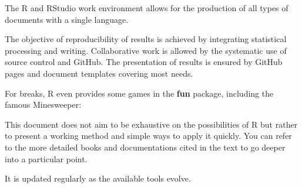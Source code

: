 \documentclass[
  12pt,
  american,
  a4paper,
  extrafontsizes,onecolumn,openright
  ]{memoir}
\makeatletter
\newenvironment{Shaded}{\begin{snugshade}}{\end{snugshade}}
\newcommand{\AttributeTok}[1]{\textcolor[rgb]{0.13,0.29,0.53}{#1}}
\newcommand{\CommentTok}[1]{\textcolor[rgb]{0.56,0.35,0.01}{\textit{#1}}}
\newcommand{\ControlFlowTok}[1]{\textcolor[rgb]{0.13,0.29,0.53}{\textbf{#1}}}
\newcommand{\FunctionTok}[1]{\textcolor[rgb]{0.13,0.29,0.53}{\textbf{#1}}}
\newcommand{\NormalTok}[1]{#1}
\newcommand{\SpecialCharTok}[1]{\textcolor[rgb]{0.81,0.36,0.00}{\textbf{#1}}}
\newcommand{\StringTok}[1]{\textcolor[rgb]{0.31,0.60,0.02}{#1}}
\newcommand{\MemoirChapStyle}{daleif1}
\newcommand{\MemoirPageStyle}{Ruled}
\newlength\widthw %
\newcommand*{\SmallMargins}{
  \setlrmarginsandblock{1.5in}{1.5in}{*}
  \setmarginnotes{0.1in}{0.1in}{0.1in}
 \setulmarginsandblock{1.5in}{1in}{*}
  \checkandfixthelayout
  \ch@ngetext
  \clearpage
  \setlength{\widthw}{\textwidth+\marginparsep+\marginparwidth}
  \footnotesatfoot
  \chapterstyle{\MemoirChapStyle}  %
  \pagestyle{\MemoirPageStyle}
}
\newcommand{\LargeMargins}{\SmallMargins}
\makeatother
\begin{document}
The R and RStudio work environment allows for the production of all types of documents with a single language.

The objective of reproducibility of results is achieved by integrating statistical processing and writing.
Collaborative work is allowed by the systematic use of source control and GitHub.
The presentation of results is ensured by GitHub pages and document templates covering most needs.

For breaks, R even provides some games in the \textbf{fun} package, including the famous Minesweeper:

\scriptsize

\begin{Shaded}
\end{Shaded}

\normalsize

This document does not aim to be exhaustive on the possibilities of R but rather to present a working method and simple ways to apply it quickly.
You can refer to the more detailed books and documentations cited in the text to go deeper into a particular point.

It is updated regularly as the available tools evolve.



\backmatter
\SmallMargins

\printbibliography
\onecolumn




\cleardoublepage
\LargeMargins
\listoffigures


\end{document}
